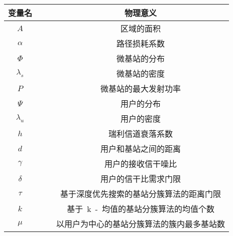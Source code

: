 {
%
\begin{table}[htbp]
\label{sinr_sim_para}
\vspace{0.5em}\centering\wuhao
\begin{tabular}{cccc}
\toprule[1.5pt]
变量名 & & & 物理意义 \\
\midrule[0.5pt]
$A$         & & & 区域的面积\tabularnewline
$\alpha$    & & & 路径损耗系数\tabularnewline
$\Phi$      & & & 微基站的分布\tabularnewline
$\lambda_s$ & & & 微基站的密度\tabularnewline
$P$         & & & 微基站的最大发射功率\tabularnewline
$\Psi$      & & & 用户的分布\tabularnewline
$\lambda_u$ & & & 用户的密度\tabularnewline
$h$         & & & 瑞利信道衰落系数\tabularnewline
$d$         & & & 用户和基站之间的距离\tabularnewline
$\gamma$    & & & 用户的接收信干噪比\tabularnewline
$\delta$    & & & 用户的信干比需求门限\tabularnewline
$\tau$      & & & 基于深度优先搜索的基站分簇算法的距离门限\tabularnewline
$k$         & & & 基于~k~-~均值的基站分簇算法的均值个数\tabularnewline
$\mu$       & & & 以用户为中心的基站分簇算法的簇内最多基站数\tabularnewline
\bottomrule[1.5pt]
\end{tabular}
\end{table}
}
